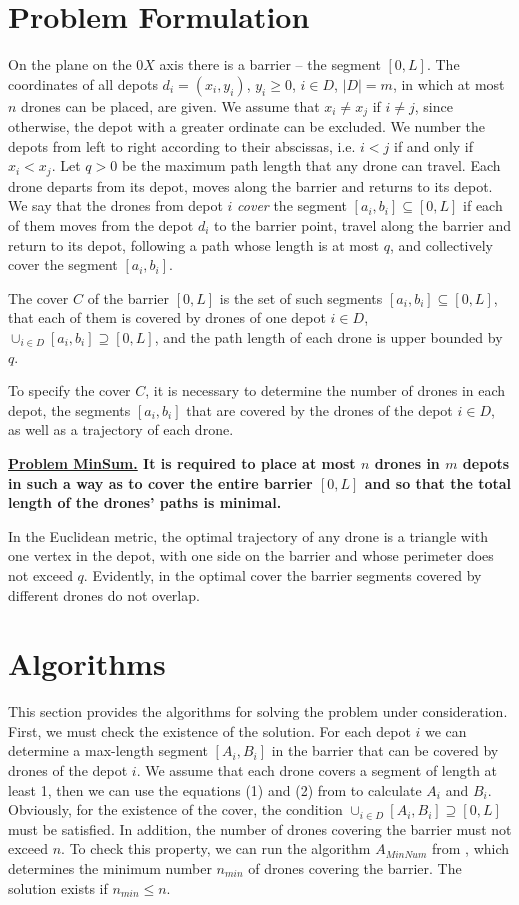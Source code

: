 \documentclass[runningheads]{llncs}
\begin{document}
\section{Problem Formulation}
On the plane on the $0X$ axis there is a barrier -- the segment $[0,L]$. The coordinates of all depots $d_i=(x_i,y_i)$, $y_i\geq 0$, $i\in D$, $|D|=m$, in which at most $n$ drones can be placed, are given. We assume that $x_i\neq x_j$ if $i\neq j$, since otherwise, the depot with a greater ordinate can be excluded. We number the depots from left to right according to their abscissas, i.e. $i<j$ if and only if $x_i<x_j$. Let $q>0$ be the maximum path length that any drone can travel. Each drone departs from its depot, moves along the barrier and returns to its depot. We say that the drones from depot $i$ \emph{cover} the segment $[a_i,b_i]\subseteq [0,L]$ if each of them moves from the depot $d_i$ to the barrier point, travel along the barrier and return to its depot, following a path whose length is at most $q$, and collectively cover the segment $[a_i,b_i]$.

\begin{definition}
The cover  $C$ of the barrier $[0,L]$ is the set of such segments $[a_i,b_i]\subseteq[0,L]$, that each of them is covered by drones of one depot $i\in D$, $\cup_{i\in D}[a_i,b_i]\supseteq [0,L]$, and the path length of each drone is upper bounded by $q$.
\end{definition}

To specify the cover $C$, it is necessary to determine the number of drones in each depot, the segments $[a_i,b_i]$ that are covered by the drones of the depot $i\in D$, as well as a trajectory of each drone.

\textbf{\underline{Problem MinSum.} It is required to place at most $n$ drones in $m$ depots in such a way as to cover the entire barrier $[0,L]$ and so that the total length of the drones’ paths is minimal.}

In the Euclidean metric, the optimal trajectory of any drone is a triangle with one vertex in the depot, with one side on the barrier and whose perimeter does not exceed $q$. Evidently, in the optimal cover the barrier segments covered by different drones do not overlap.

\section{Algorithms}
This section provides the algorithms for solving the problem under consideration. First, we must check the existence of the solution. For each depot $i$ we can determine a max-length segment $[A_i,B_i]$ in the barrier that can be covered by drones of the depot $i$. We assume that each drone covers a segment of length at least 1, then we can use the equations (1) and (2) from \cite{ErShad24} to calculate $A_i$ and $B_i$. Obviously, for the existence of the cover, the condition $\cup_{i\in D} [A_i,B_i]\supseteq [0,L]$ must be satisfied. In addition, the number of drones covering the barrier must not exceed $n$. To check this property, we can run the algorithm $A_{MinNum}$ from \cite{ErShad24}, which determines the minimum number $n_{min}$ of drones covering the barrier. The solution exists if $n_{min}\leq n$.
\end{document}
